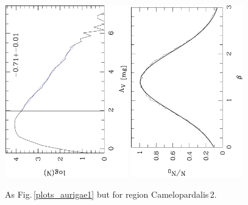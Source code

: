 \documentclass[useAMS,usenatbib]{mn2e}
\begin{document}
\begin{appendix}
\begin{figure}
\includegraphics[height=7.5cm,angle=-90]{av_dist_chameleopardalis2.ps}
\hfill
\includegraphics[height=7.5cm,angle=-90]{histo_chameleopardalis2.ps}
\caption{\label{plots_chameleopardalis2} As Fig.\,\ref{plots_aurigae1} but for
region Camelopardalis\,2.}   
\end{figure}


\end{appendix}
\end{document}
